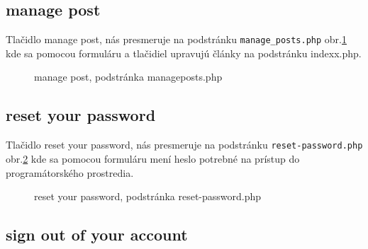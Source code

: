 \subsection{manage post}

Tlačidlo manage post, nás presmeruje na podstránku \verb|manage_posts.php| obr.\ref{OBRAZOK 1.12} kde sa pomocou formuláru a tlačidiel upravujú články na podstránku indexx.php.

\begin{figure}[!tbh]
\centering
\setlength{\fboxsep}{0pt}%
\setlength{\fboxrule}{1pt}%
\caption{manage post, podstránka manageposts.php}\label{OBRAZOK 1.12}
\end{figure}

\subsection{reset your password}

Tlačidlo reset your password, nás presmeruje na podstránku \verb|reset-password.php| obr.\ref{OBRAZOK 1.13} kde sa pomocou formuláru mení heslo potrebné na prístup do programátorského prostredia.

\begin{figure}[!tbh]
\centering
\setlength{\fboxsep}{0pt}%
\setlength{\fboxrule}{1pt}%
\caption{reset your password, podstránka reset-password.php}\label{OBRAZOK 1.13}
\end{figure}

\subsection{sign out of your account}

